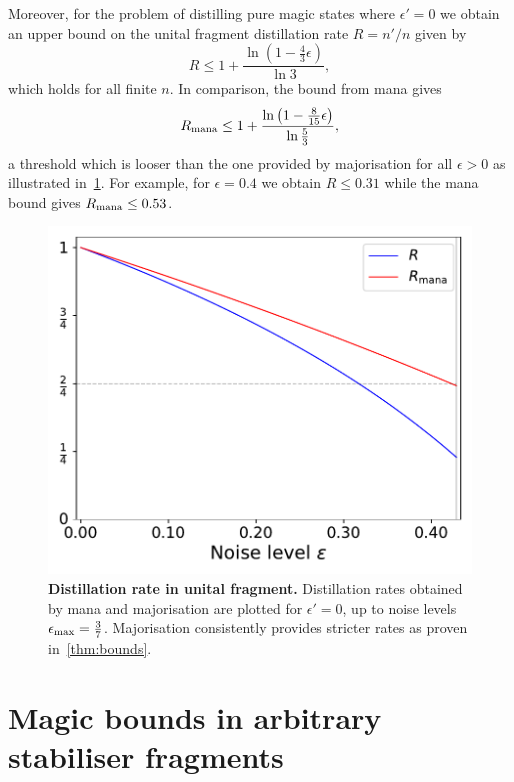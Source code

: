 \documentclass[pra,
aps,
twocolumn,
superscriptaddress,
groupedaddress,
nofootinbib,
reprint
]{revtex4-1}
\begin{document}
Moreover, for the problem of distilling pure magic states where $\epsilon'=0$ we obtain an upper bound on the unital fragment distillation rate $R=n'/n$ given by
\begin{equation}
R \leq 1 + \frac{\ln (1 - \frac{4}{3} \epsilon)}{\ln 3},
\end{equation}
which holds for all finite $n$. 
In comparison, the bound from mana gives 
\begin{equation}
	R_{\rm{mana}} \leq 1 + \frac{\ln \left(1 - \frac{8}{15}\epsilon \right)}{\ln \frac{5}{3}},
\end{equation}
a threshold which is looser than the one provided by majorisation for all $\epsilon > 0$ as illustrated in~\cref{fig:distill_bounds}.
For example, for $\epsilon = 0.4$ we obtain $R\le 0.31 $ while the mana bound gives $R_{\rm{mana}} \le 0.53$.
\begin{figure}[t]
    \centering
    \includegraphics[scale=0.5]{figs/distill_bounds.pdf}
    \caption{\textbf{Distillation rate in unital fragment.} Distillation rates obtained by mana and majorisation are plotted for $\epsilon' = 0$, up to noise levels $\epsilon_{\rm{max}} = \frac{3}{7}$.
    Majorisation consistently provides stricter rates as proven in~\cref{thm:bounds}. 
    }
    \label{fig:distill_bounds}
\end{figure}

\section{Magic bounds in arbitrary stabiliser fragments}
\label{sec:stab}
\end{document}
